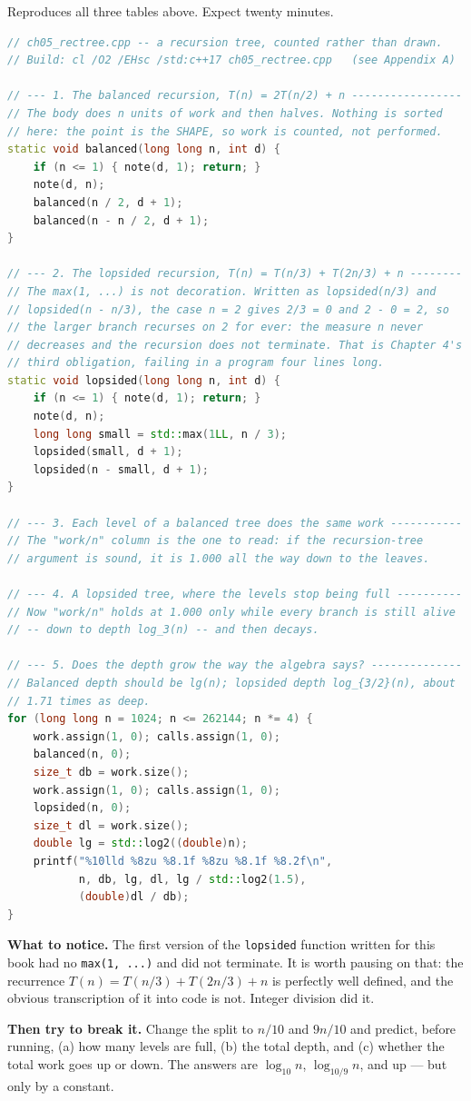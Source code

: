 \begin{lab}
Reproduces all three tables above. Expect twenty minutes.

\begin{lstlisting}[language=C++]
// ch05_rectree.cpp -- a recursion tree, counted rather than drawn.
// Build: cl /O2 /EHsc /std:c++17 ch05_rectree.cpp   (see Appendix A)

// --- 1. The balanced recursion, T(n) = 2T(n/2) + n -----------------
// The body does n units of work and then halves. Nothing is sorted
// here: the point is the SHAPE, so work is counted, not performed.
static void balanced(long long n, int d) {
    if (n <= 1) { note(d, 1); return; }
    note(d, n);
    balanced(n / 2, d + 1);
    balanced(n - n / 2, d + 1);
}

// --- 2. The lopsided recursion, T(n) = T(n/3) + T(2n/3) + n --------
// The max(1, ...) is not decoration. Written as lopsided(n/3) and
// lopsided(n - n/3), the case n = 2 gives 2/3 = 0 and 2 - 0 = 2, so
// the larger branch recurses on 2 for ever: the measure n never
// decreases and the recursion does not terminate. That is Chapter 4's
// third obligation, failing in a program four lines long.
static void lopsided(long long n, int d) {
    if (n <= 1) { note(d, 1); return; }
    note(d, n);
    long long small = std::max(1LL, n / 3);
    lopsided(small, d + 1);
    lopsided(n - small, d + 1);
}

// --- 3. Each level of a balanced tree does the same work -----------
// The "work/n" column is the one to read: if the recursion-tree
// argument is sound, it is 1.000 all the way down to the leaves.

// --- 4. A lopsided tree, where the levels stop being full ----------
// Now "work/n" holds at 1.000 only while every branch is still alive
// -- down to depth log_3(n) -- and then decays.

// --- 5. Does the depth grow the way the algebra says? --------------
// Balanced depth should be lg(n); lopsided depth log_{3/2}(n), about
// 1.71 times as deep.
for (long long n = 1024; n <= 262144; n *= 4) {
    work.assign(1, 0); calls.assign(1, 0);
    balanced(n, 0);
    size_t db = work.size();
    work.assign(1, 0); calls.assign(1, 0);
    lopsided(n, 0);
    size_t dl = work.size();
    double lg = std::log2((double)n);
    printf("%10lld %8zu %8.1f %8zu %8.1f %8.2f\n",
           n, db, lg, dl, lg / std::log2(1.5),
           (double)dl / db);
}
\end{lstlisting}

\textbf{What to notice.} The first version of the \texttt{lopsided} function
written for this book had no \texttt{max(1, ...)} and did not terminate. It is
worth pausing on that: the recurrence $T(n) = T(n/3) + T(2n/3) + n$ is
perfectly well defined, and the obvious transcription of it into code is not.
Integer division did it.

\smallskip
\textbf{Then try to break it.} Change the split to $n/10$ and $9n/10$ and
predict, before running, (a) how many levels are full, (b) the total depth, and
(c) whether the total work goes up or down. The answers are $\log_{10} n$,
$\log_{10/9} n$, and up --- but only by a constant.
\end{lab}

